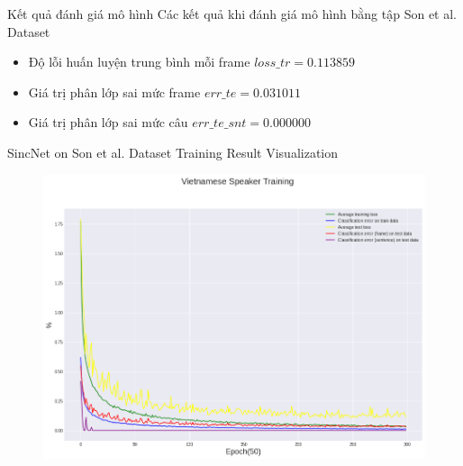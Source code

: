 \documentclass[notheorems, aspectratio=54]{beamer}
\begin{document}
\begin{frame}{Kết quả đánh giá mô hình}
	Các kết quả khi đánh giá mô hình bằng tập Son et al. Dataset
	\begin{itemize}
		\item Độ lỗi huấn luyện trung bình mỗi frame $loss\_tr=0.113859$
		\item Giá trị phân lớp sai mức frame $err\_te=0.031011$
		\item Giá trị phân lớp sai mức câu $err\_te\_snt =0.000000$
	\end{itemize}
\end{frame}
\begin{frame}{SincNet on Son et al. Dataset Training Result Visualization}
	\begin{figure}[H]
		\includegraphics[width=0.8\linewidth]{result/sincnet_vietnamese_plot.png}
		\label{fig:writing-thesis}
	\end{figure}
\end{frame}
\end{document}
